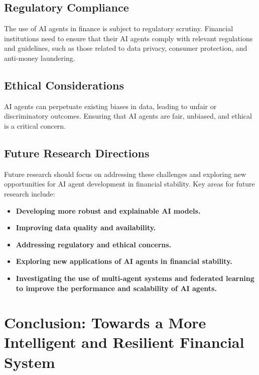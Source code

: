 \documentclass[a4paper,headinclude=on,footinclude=on,12pt,oneside]{scrbook}
\begin{document}
																\subsection*{Regulatory Compliance}
																
																The use of AI agents in finance is subject to regulatory scrutiny. Financial institutions need to ensure that their AI agents comply with relevant regulations and guidelines, such as those related to data privacy, consumer protection, and anti-money laundering.
																
																\subsection*{Ethical Considerations}
																
																AI agents can perpetuate existing biases in data, leading to unfair or discriminatory outcomes. Ensuring that AI agents are fair, unbiased, and ethical is a critical concern.
																
																\subsection*{Future Research Directions}
																
																Future research should focus on addressing these challenges and exploring new opportunities for AI agent development in financial stability. Key areas for future research include:
																
																\begin{itemize}
																	\item \textbf{Developing more robust and explainable AI models.}
																	\item \textbf{Improving data quality and availability.}
																	\item \textbf{Addressing regulatory and ethical concerns.}
																	\item \textbf{Exploring new applications of AI agents in financial stability.}
																	\item \textbf{Investigating the use of multi-agent systems and federated learning to improve the performance and scalability of AI agents.}
																\end{itemize}
																
																\section*{Conclusion: Towards a More Intelligent and Resilient Financial System}
																
\end{document}
